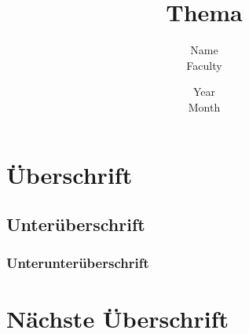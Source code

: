 \documentclass[a4, 12pt]{article}
\begin{document}
\begin{titlepage}
    \pagestyle{fancyplain} 
    \fancyfoot[C]{} 
    \title{Thema}
    \date{Year\\ Month}
    \author{Name\\ Faculty}
    \maketitle
    \begin{abstract}
        \blindtext\cite{Joa10:1}
    \end{abstract}
\end{titlepage}

\pagestyle{fancyplain} 
\fancyhead[R]{}
\fancyfoot[C]{} 
\renewcommand{\headrulewidth}{1pt}
\renewcommand{\footrulewidth}{1pt}

\clearpage
\tableofcontents
\clearpage

\section{Überschrift}
\blindtext

\subsection{Unterüberschrift}
\blindtext

\subsubsection{Unterunterüberschrift}
\blindtext

\section{Nächste Überschrift}
\blindmathpaper

\clearpage


\end{document}

